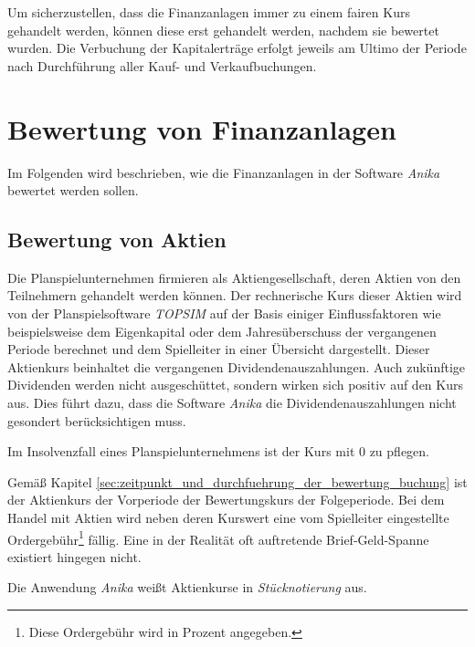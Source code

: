 \documentclass[12pt, a4paper]{article}
\theoremstyle{plain}
\begin{document}
Um sicherzustellen, dass die Finanzanlagen immer zu einem fairen Kurs gehandelt werden, können diese erst gehandelt werden, nachdem sie bewertet wurden. 
Die Verbuchung der Kapitalerträge erfolgt jeweils am Ultimo der Periode nach Durchführung aller Kauf- und Verkaufbuchungen.

\section{Bewertung von Finanzanlagen}
\label{sec:bewertung_von_finanzanlagen}
Im Folgenden wird beschrieben, wie die Finanzanlagen in der Software \textit{Anika} bewertet werden sollen.

\subsection{Bewertung von Aktien}
\label{sec:bewertung_von_aktien}
Die Planspielunternehmen firmieren als Aktiengesellschaft, deren Aktien von den Teilnehmern gehandelt werden können.
Der rechnerische Kurs dieser Aktien wird von der Planspielsoftware \textit{TOPSIM} auf der Basis einiger Einflussfaktoren wie beispielsweise dem Eigenkapital oder dem Jahresüberschuss der vergangenen Periode berechnet und dem Spielleiter in einer Übersicht dargestellt.
Dieser Aktienkurs beinhaltet die vergangenen Dividendenauszahlungen. Auch zukünftige Dividenden werden nicht ausgeschüttet, sondern wirken sich positiv auf den Kurs aus. Dies führt dazu, dass die Software \textit{Anika} die Dividendenauszahlungen nicht gesondert berücksichtigen muss.

Im Insolvenzfall eines Planspielunternehmens ist der Kurs mit 0 zu pflegen.


Gemäß Kapitel \ref{sec:zeitpunkt_und_durchfuehrung_der_bewertung_buchung} ist der Aktienkurs der Vorperiode der Bewertungskurs der Folgeperiode.
Bei dem Handel mit Aktien wird neben deren Kurswert eine vom Spielleiter eingestellte Ordergebühr\footnote{Diese Ordergebühr wird in Prozent angegeben.} fällig. Eine in der Realität oft auftretende Brief-Geld-Spanne existiert hingegen nicht.

Die Anwendung \textit{Anika} weißt Aktienkurse in \textit{Stücknotierung} aus.
\end{document}

